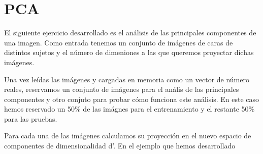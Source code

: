 \section{PCA}
El siguiente ejercicio desarrollado es el análisis de las principales componentes de una imagen. Como entrada tenemos un conjunto de imágenes de caras de distintos sujetos y el número de dimeniones a las que queremos proyectar dichas imágenes.\par
Una vez leídas las imágenes y cargadas en memoria como un vector de número reales, reservamos un conjunto de imágenes para el anális de las principales componentes y otro conjuto para probar cómo funciona este análisis. En este caso hemos reservado un 50\% de las imágnes para el entrenamiento y el restante 50\% para las pruebas.\par
Para cada una de las imágenes calculamos su proyección en el nuevo espacio de componentes de dimensionalidad d'. En el ejemplo que hemos desarrollado 

